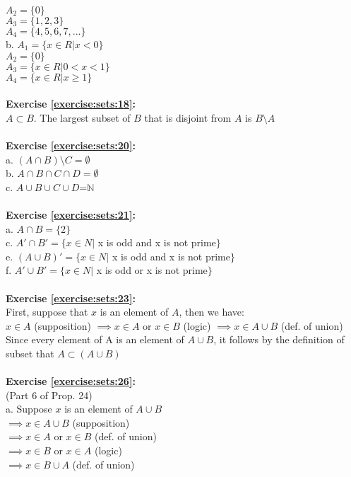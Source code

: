$A_2=\{0\}$\\
$A_3=\{1,2,3\}$\\
$A_4=\{4,5,6,7,...\}$\\
b. $A_1=\{x\in R|x<0\}$\\
$A_2=\{0\}$\\
$A_3=\{x\in R|0<x<1\}$\\
$A_4=\{x\in R|x\ge 1\}$\\
\\
\textbf{Exercise \ref{exercise:sets:18}:}\\
$A\subset B$. The largest subset of $B$ that is disjoint from $A$ is $B\setminus A$\\
\\
\textbf{Exercise \ref{exercise:sets:20}:}\\
a. $(A\cap B)\setminus C=\emptyset$\\
b. $A\cap B\cap C\cap D=\emptyset$\\
c. $A \cup B \cup C \cup D$=$\mathbb{N}$\\
\\
\textbf{Exercise \ref{exercise:sets:21}:}\\
a. $A\cap B=\{2\}$\\
c. $A'\cap B'=\{x\in N|$ x is odd and x is not prime$\}$\\
e. $(A\cup B)'=\{x\in N|$ x is odd and x is not prime$\}$\\
f. $A'\cup B'=\{x\in N|$ x is odd or x is not prime$\}$\\
\\
\textbf{Exercise \ref{exercise:sets:23}:}\\
First, suppose that $x$ is an element of $A$, then we have:\\
$x\in A$ (supposition) $\implies x\in A$ or $x\in B$ (logic) $\implies x\in A\cup B$ (def. of union)\\
Since every element of A is an element of $A\cup B$, it follows by the definition of subset that $A\subset (A\cup B)$\\
\\
\textbf{Exercise \ref{exercise:sets:26}:}\\
(Part 6 of Prop. 24)\\
a. Suppose $x$ is an element of $A\cup B$\\
$\implies x\in A\cup B$ (supposition)\\
$\implies x\in A$ or $x\in B$ (def. of union)\\
$\implies x\in B$ or $x\in A$ (logic)\\
$\implies x\in B\cup A$ (def. of union)\\
